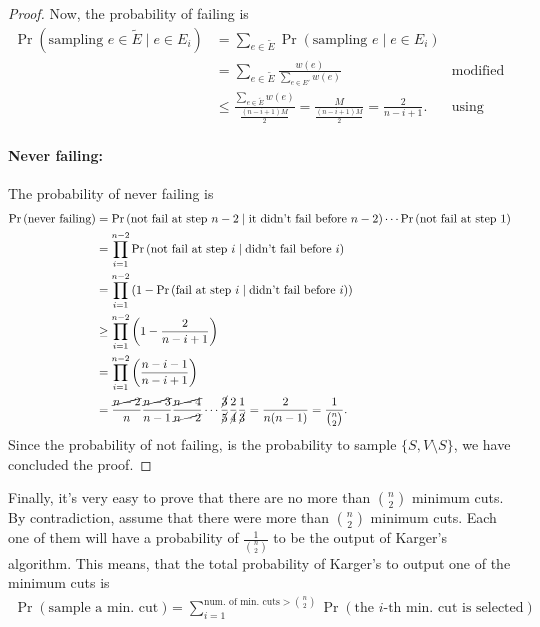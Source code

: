 \documentclass[11pt]{article}
\begin{document}
\begin{enumerate}
\begin{proof}
        Now, the probability of failing is 
        \begin{align*}
            \Pr\left(\text{sampling }e \in \tilde E \mid e \in E_i\right) &= \sum_{e \in \tilde E}\Pr\left(\text{sampling }e\mid e \in E_i\right)\\
            &= \sum_{e \in \tilde E}\frac{w(e)}{\sum_{e\in E'}w(e)} &\text{modified algoritm}\\
            & \leq \frac{\sum_{e \in \tilde E}w(e)}{\frac{(n-i+1)M}{2}} = \frac{M}{\frac{(n-i+1)M}{2}} = \frac{2}{n-i+1}. &\text{using the result above}
        \end{align*}
        \paragraph*{Never failing:} The probability of never failing is 
        \begin{align*}
            \Pr\left(\text{never failing}\right) &= \Pr\left(\text{not fail at step $n-2$}\mid \text{it didn't fail before $n-2$}\right) \cdots \Pr\left(\text{not fail at step $1$}\right)\\
            &=\prod_{i=1}^{n-2}\Pr\left(\text{not fail at step $i$}\mid \text{didn't fail before $i$}\right)\\
            & = \prod_{i=1}^{n-2}\left(1-\Pr\left(\text{fail at step $i$}\mid \text{didn't fail before $i$}\right)\right)\\
            & \geq \prod_{i=1}^{n-2}\left(1-\frac{2}{n-i+1}\right) \\
            & = \prod_{i=1}^{n-2}\left(\frac{n-i-1}{n-i+1}\right) \\
            & = \frac{\cancel{n-2}}{n}\frac{\cancel{n-3}}{n-1}\frac{\cancel{n-4}}{\cancel{n-2}}\cdots \frac{\cancel{3}}{\cancel{5}}\frac{2}{\cancel{4}}\frac{1}{\cancel{3}} = \frac{2}{n(n-1)} = \frac{1}{\binom{n}{2}}.
        \end{align*}
        Since the probability of not failing, is the probability to sample $\{S,V\setminus S\}$, we have concluded the proof.
    \end{proof}
    Finally, it's very easy to prove that there are no more than $\binom{n}{2}$ minimum cuts. By contradiction, assume that there were more than $\binom{n}{2}$ minimum cuts. Each one of them will have a probability of $\frac{1}{\binom{n}{2}}$ to be the output of Karger's algorithm. This means, that the total probability of Karger's to output one of the minimum cuts is 
    \begin{align*}
        \Pr(\text{sample a min. cut}) &= \sum_{i=1}^{\text{num. of min. cuts}>\binom{n}{2}}\Pr(\text{the $i$-th min. cut is selected}) \\

\end{align*}
\end{enumerate}
\end{document}
